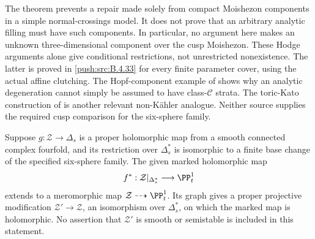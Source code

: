 The theorem prevents a repair made solely from compact
Moishezon components in a simple normal-crossings model.
It does not prove that an arbitrary analytic filling must have
such components. In particular, no argument here makes an
unknown three-dimensional component over the cusp Moishezon.
These Hodge arguments alone give conditional restrictions, not
unrestricted nonexistence. The latter is proved in \ref{push:src:B.4.33} for
every finite parameter cover, using the actual affine clutching.
The Hopf-component example of
\citet[Theorem 1.4 and Example 2.1]{Nishiguchi1988IIRoot}
shows why an analytic degeneration cannot simply be assumed to
have class-$\mathcal C$ strata. The toric-Kato construction of
\citet[Theorem 7.1]{IstratiEtAl2022Root} is another relevant
non-K\"ahler analogue. Neither source supplies the required
cusp comparison for the six-sphere family.

\begin{proposition}\label{push:src:B.4.4}
Suppose $g:\mathcal Z\to\Delta_s$ is a proper holomorphic map
from a smooth connected complex fourfold, and its restriction
over $\Delta_s^*$ is
isomorphic to a finite base change of the specified six-sphere
family. The given marked holomorphic map
\[
 f^*:\mathcal Z|_{\Delta_s^*}\longrightarrow\PP^1_t
\]
extends to a meromorphic map $\mathcal Z\dashrightarrow\PP^1_t$.
Its graph gives a proper projective modification
$\mathcal Z'\to\mathcal Z$, an isomorphism over
$\Delta_s^*$, on which the marked map is holomorphic.
No assertion that $\mathcal Z'$ is smooth or semistable is
included in this statement.
\end{proposition}

